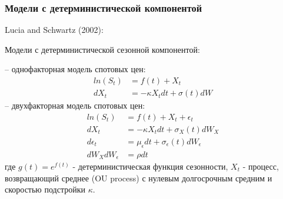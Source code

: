\documentclass[c, dvipsnames]{beamer}  %
\begin{document}
\begin{frame}[shrink=5]
\frametitle{Модели с детерминистической компонентой} 

\begin{block}{Lucia and Schwartz (2002): }

Модели с детерминистической сезонной компонентой:   

-- однофакторная модель спотовых цен: 	
	\begin{align*}
	 ln (S_t) & = f(t) + X_t \\
	dX_t & = -\kappa X_t dt + \sigma(t) dW
	\end{align*}
-- двухфакторная модель спотовых цен: 	
\begin{align*}
ln (S_t) & = f(t) + X_t + \epsilon_t\\
dX_t & = -\kappa X_t dt + \sigma_X(t) dW_X\\
d\epsilon_t & = \mu_{\epsilon}  dt + \sigma_{\epsilon}(t) dW_{\epsilon}\\
dW_X dW_{\epsilon} &= \rho dt
\end{align*}
\footnotesize{
где  $g(t) = e^{f(t)}$ - детерминистическая функция сезонности, $X_t$ - процесс, возвращающий среднее (OU process) с нулевым долгосрочным средним и скоростью подстройки $\kappa$.}
\end{block}


%	
%	
\end{frame}
\end{document}

